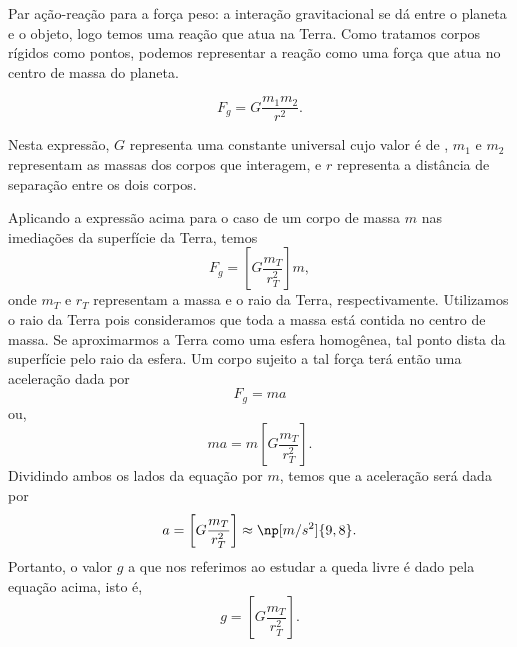 \begin{marginfigure}
\centering
{}
\caption{Par ação-reação para a força peso: a interação gravitacional se dá entre o planeta e o objeto, logo temos uma reação que atua na Terra. Como tratamos corpos rígidos como pontos, podemos representar a reação como uma força que atua no centro de massa do planeta.}
\end{marginfigure}

\begin{equation}\label{Eq:LeiGravitacaoUniversal}
  F_g = G \frac{m_1 m_2}{r^2}.
\end{equation}

\noindent{}Nesta expressão, $G$ representa uma constante universal cujo valor é de , $m_1$ e $m_2$ representam as massas dos corpos que interagem, e $r$ representa a distância de separação entre os dois corpos.

Aplicando a expressão acima para o caso de um corpo de massa $m$ nas imediações da superfície da Terra, temos
\begin{equation}
  F_g = \left[G \frac{m_T}{r_T^2}\right]m,
\end{equation}
%
onde $m_T$ e $r_T$ representam a massa e o raio da Terra, respectivamente. Utilizamos o raio da Terra pois consideramos que toda a massa está contida no centro de massa. Se aproximarmos a Terra como uma esfera homogênea, tal ponto dista da superfície pelo raio da esfera. Um corpo sujeito a tal força terá então uma aceleração dada por
\begin{equation}
  F_g = ma
\end{equation}
%
ou,
\begin{equation}\label{Eq:EliminaM}
  ma = m \left[G \frac{m_T}{r_T^2}\right].
\end{equation}
%
Dividindo ambos os lados da equação por $m$, temos que a aceleração será dada por
\begin{equation}
  a = \left[G \frac{m_T}{r_T^2}\right] \approx \np[m/s^2]{9,8}.
\end{equation}
%
Portanto, o valor $g$ a que nos referimos ao estudar a queda livre é dado pela equação acima, isto é,
\begin{equation}
  g = \left[G \frac{m_T}{r_T^2}\right].
\end{equation}

